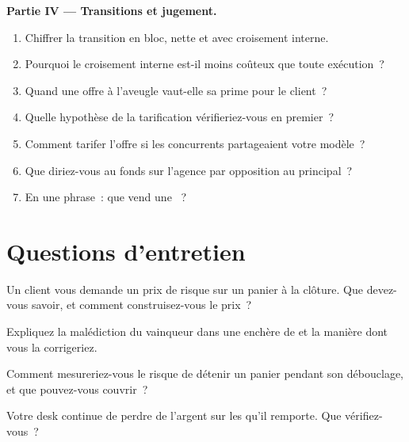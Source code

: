 \begin{problem}
\medskip\noindent\textbf{Partie IV --- Transitions et jugement.}
\begin{enumerate}[resume]
\item Chiffrer la transition en bloc, nette et avec croisement interne.
\item Pourquoi le croisement interne est-il moins coûteux que toute exécution~?
\item Quand une offre à l'aveugle vaut-elle sa prime pour le client~?
\item Quelle hypothèse de la tarification vérifieriez-vous en premier~?
\item Comment tarifer l'offre si les concurrents partageaient votre modèle~?
\item Que diriez-vous au fonds sur l'agence par opposition au principal~?
\item En une phrase~: que vend une ~?
\end{enumerate}
\end{problem}

\section{Questions d'entretien}

\begin{interviewq}\label{iq:mx:portfolio-trades-and-risk-bids:1}
Un client vous demande un prix de risque sur un panier à la clôture. Que devez-vous savoir, et comment construisez-vous le prix~?
\end{interviewq}

\begin{interviewq}\label{iq:mx:portfolio-trades-and-risk-bids:2}
Expliquez la malédiction du vainqueur dans une enchère de  et la manière dont vous la corrigeriez.
\end{interviewq}

\begin{interviewq}\label{iq:mx:portfolio-trades-and-risk-bids:3}
Comment mesureriez-vous le risque de détenir un panier pendant son débouclage, et que pouvez-vous couvrir~?
\end{interviewq}

\begin{interviewq}\label{iq:mx:portfolio-trades-and-risk-bids:4}
Votre desk continue de perdre de l'argent sur les  qu'il remporte. Que vérifiez-vous~?
\end{interviewq}

